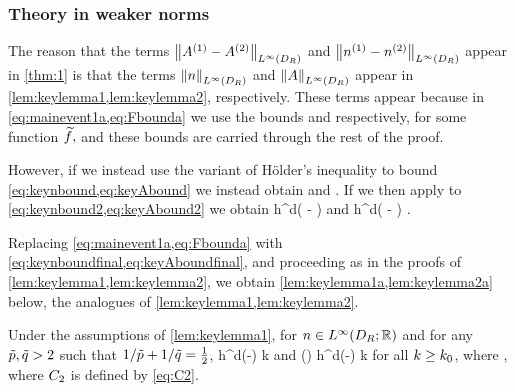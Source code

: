 \subsubsection{Theory in weaker norms}\label{sec:weakertheory}
The reason that the terms $\NLiDR{\Aso-\Ast}$ and $\NLiDR{\nso-\nst}$ appear in \cref{thm:1} is that the terms $\NLiDR{n}$ and $\NLiDR{A}$ appear in \cref{lem:keylemma1,lem:keylemma2}, respectively. These terms appear because in \cref{eq:mainevent1a,eq:Fbounda} we use the bounds
\beq\label{eq:keynbound}
 \leq {}\NLtDR{\ftilde}
\eeq
and
\beq\label{eq:keyAbound}
 \leq {}\NLtDR{\grad \ftilde}
\eeq
respectively, for some function $\widetilde{f},$ and these bounds are carried through the rest of the proof.

However, if we instead use the variant of H\"older's inequality to bound \cref{eq:keynbound,eq:keyAbound} we instead obtain
\beq\label{eq:keynbound2}
 \leq {}\NLptildeDR{\ftilde}
\eeq
and
\beq\label{eq:keyAbound2}
 \leq {}\NLptildeDR{\ftilde}.
\eeq
If we then apply to \cref{eq:keynbound2,eq:keyAbound2} we obtain
\beq\label{eq:keynboundfinal}
 \leq \Cinvptilde {} h^{d\mleft( - \half\mright)} \NLtDR{\ftilde}
\eeq
and
\beq\label{eq:keyAboundfinal}
 \leq \Cinvptilde {} h^{d\mleft( - \half\mright)} \NLtDR{\grad\ftilde}.
\eeq

Replacing \cref{eq:mainevent1a,eq:Fbounda} with \cref{eq:keynboundfinal,eq:keyAboundfinal}, and proceeding as in the proofs of \cref{lem:keylemma1,lem:keylemma2}, we obtain \cref{lem:keylemma1a,lem:keylemma2a} below, the analogues of \cref{lem:keylemma1,lem:keylemma2}.

\label{lem:keylemma1a}
Under the assumptions of \cref{lem:keylemma1}, for $n\in \LiDRRR$ and for any $\tilde{p},\tilde{q} > 2$ such that $1/\tilde{p} + 1/\tilde{q} = \frac{1}{2}$,
\beq\label{eq:keybound12}
\max\set{\NDk{\AmatoI \Mmatn},\NDkI{\Mmatn\AmatoI}} \leq \Cttilde h^{d\mleft(-\half\mright)} k
\eeq
and 
\beq\label{eq:keybound1a2}
\max\set{\Nt{\AmatoI \Mmatn},\Nt{\Mmatn\AmatoI}} \leq \Cttilde\mleft(\frac{\mplus}{\mminus}\mright) h^{d\mleft(-\half\mright)} k
\eeq
for all $k\geq k_{0}$,
where
\beq\label{eq:C2tilde}
\Cttilde\de%
\Cinvptilde\Ct,
\eeq
where $C_{2}$ is defined by \cref{eq:C2}.
\ele


